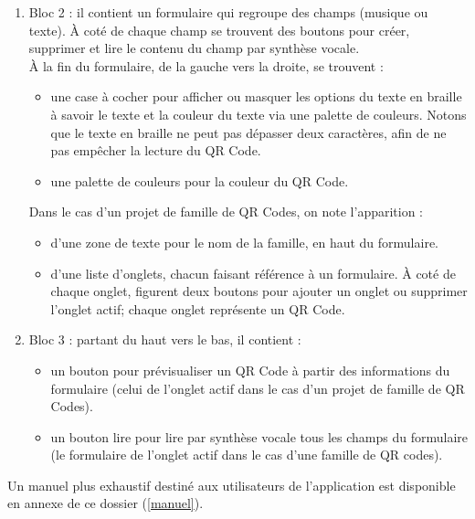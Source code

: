 \begin{enumerate}
\newpage
\item Bloc 2 : il contient un formulaire qui regroupe des champs (musique ou texte). À coté de chaque champ se trouvent des boutons pour créer, supprimer et lire le contenu du champ par synthèse vocale.\\
À la fin du formulaire, de la gauche vers la droite, se trouvent :
	\begin{itemize}
	\item une case à cocher pour afficher ou masquer les options du texte en braille à savoir le texte et la couleur du texte via une palette de couleurs. Notons que le texte en braille ne peut pas dépasser deux caractères, afin de ne pas empêcher la lecture du QR Code.
	\item une palette de couleurs pour la couleur du QR Code.
	\end{itemize}
Dans le cas d'un projet de famille de QR Codes, on note l'apparition :
	\begin{itemize}
	\item d'une zone de texte pour le nom de la famille, en haut du formulaire.
	\item d'une liste d'onglets, chacun faisant référence à un formulaire. À coté de chaque onglet, figurent deux boutons pour ajouter un onglet ou supprimer l'onglet actif; chaque onglet représente un QR Code.
	\end{itemize}
	
\item Bloc 3 : partant du haut vers le bas, il contient : 
	\begin{itemize}
	\item un bouton pour prévisualiser un QR Code à partir des informations du formulaire (celui de l'onglet actif dans le cas d'un projet de famille de QR Codes).
	\item un bouton lire pour lire par synthèse vocale tous les champs du formulaire (le formulaire de l'onglet actif dans le cas d'une famille de QR codes).
	\end{itemize}

\end{enumerate}

\par
Un manuel plus exhaustif destiné aux utilisateurs de l'application est disponible en annexe de ce dossier (\ref{manuel}).

